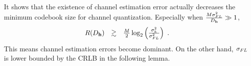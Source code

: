 \documentclass[10pt,fleqn, twocolumn]{IEEEtran}
\newcommand{\bh}{{\bf h}}
\begin{document}
\noindent It shows that the existence of channel estimation error
actually decreases the minimum codebook size for channel
quantization. Especially when $\frac{M\sigma_{\mbox{\tiny
FL}}^{2}}{D_{\bh}}\gg 1$,
\begin{equation}%
\begin{array}{rcl}
R(D_{\bh})&\gtrsim&\frac{M}{2}\log_{2}\left(\frac{\sigma_{h}^{2}}{\sigma_{\mbox{\tiny
FL}}^{2}}\right)\ .
\end{array}
\end{equation}
\noindent This means channel estimation errors become dominant. On
the other hand, $\sigma_{\mbox{\tiny FL}}$ is lower bounded by the
CRLB in the following lemma.

\begin{figure}
\end{figure}
\end{document}
